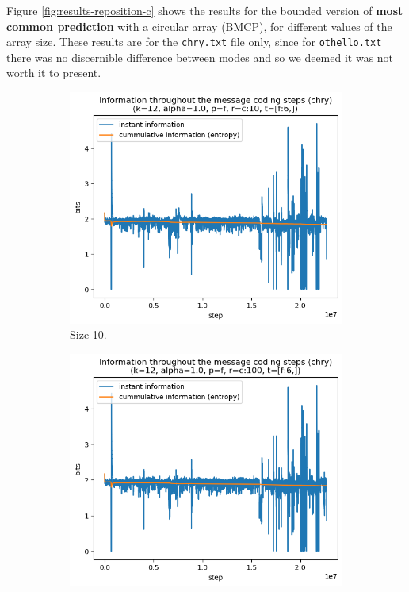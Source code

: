 \documentclass{article}
\begin{document}
Figure \ref{fig:results-reposition-c} shows the results for the bounded version of \textbf{most common prediction} with a circular array (BMCP), for different values of the array size.
These results are for the \verb|chry.txt| file only, since for \verb|othello.txt| there was no discernible difference between modes and so we deemed it was not worth it to present.

\begin{figure}
    \begin{subfigure}[b]{0.3\textwidth}
        \begin{center}
            \includegraphics[width=1.0\linewidth]{../scripts/images/chry_12_1.0_f_c:10_[f:6,].png}
        \end{center}
        \caption{Size 10.}
        \label{fig:results-reposition-c-10}
    \end{subfigure}
    \hfill
    \begin{subfigure}[b]{0.3\textwidth}
        \begin{center}
            \includegraphics[width=1.0\linewidth]{../scripts/images/chry_12_1.0_f_c:100_[f:6,].png}

\end{center}
\end{subfigure}
\end{figure}
\end{document}
